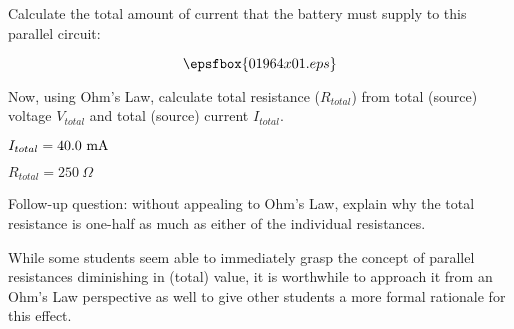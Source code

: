 

Calculate the total amount of current that the battery must supply to this parallel circuit:

$$\epsfbox{01964x01.eps}$$

Now, using Ohm's Law, calculate total resistance ($R_{total}$) from total (source) voltage $V_{total}$ and total (source) current $I_{total}$.







$I_{total} = 40.0 \hbox{ mA}$

$R_{total} = 250 \> \Omega$

\vskip 10pt

Follow-up question: without appealing to Ohm's Law, explain why the total resistance is one-half as much as either of the individual resistances.







While some students seem able to immediately grasp the concept of parallel resistances diminishing in (total) value, it is worthwhile to approach it from an Ohm's Law perspective as well to give other students a more formal rationale for this effect.




